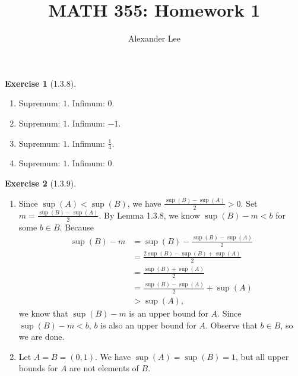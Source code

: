 \documentclass{amsart}
\title{MATH 355: Homework 1}
\author{Alexander Lee}
\theoremstyle{definition}
\newtheorem{exercise}{Exercise}
\begin{document}
\maketitle

\begin{exercise}[1.3.8]
  \begin{enumerate}[label={(\alph*)}]
    \item Supremum: $1$. Infimum: $0$.
    \item Supremum: $1$. Infimum: $-1$.
    \item Supremum: $1$. Infimum: $\frac{1}{4}$.
    \item Supremum: $1$. Infimum: $0$.
  \end{enumerate}
\end{exercise}

\begin{exercise}[1.3.9]
  \begin{enumerate}[label={(\alph*)}]
    \item Since $\sup(A) < \sup(B)$, we have $\frac{\sup(B) - \sup(A)}{2} > 0$.
      Set $m = \frac{\sup(B) - \sup(A)}{2}$. By Lemma 1.3.8, we know $\sup(B) -
      m < b$ for some $b \in B$. Because
      \begin{align*}
        \sup(B) - m &= \sup(B) - \frac{\sup(B) - \sup(A)}{2} \\
        &= \frac{2 \sup(B) - \sup(B) + \sup(A)}{2} \\
        &= \frac{\sup(B) + \sup(A)}{2} \\
        &= \frac{\sup(B) - \sup(A)}{2} + \sup(A) \\
        &> \sup(A),
      \end{align*}
      we know that $\sup(B) - m$ is an upper bound for $A$. Since $\sup(B) - m <
      b$, $b$ is also an upper bound for $A$. Observe that $b \in B$, so we are
      done.
    \item Let $A = B = (0, 1)$. We have $\sup(A) = \sup(B) = 1$, but all upper
      bounds for $A$ are not elements of $B$.
  \end{enumerate}
\end{exercise}
\end{document}
